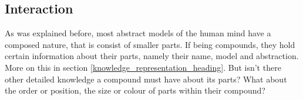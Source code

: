 %
%
%
%
%
%
%

\subsection{Interaction}
\label{interaction_heading}

As was explained before, most abstract models of the human mind have a composed
nature, that is consist of smaller parts. If being compounds, they hold certain
information about their parts, namely their name, model and abstraction. More
on this in section \ref{knowledge_representation_heading}. But isn't there
other detailed knowledge a compound must have about its parts? What about the
order or position, the size or colour of parts within their compound?







